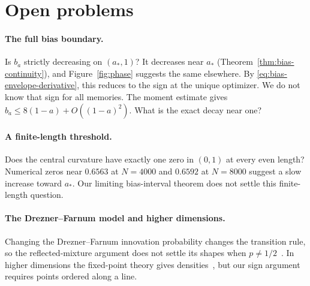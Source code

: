 \section{Open problems}\label{sec:open}

\paragraph{The full bias boundary.}
Is $b_a$ strictly decreasing on $(a_*,1)$? It decreases near $a_*$
(Theorem~\ref{thm:bias-continuity}), and Figure~\ref{fig:phase}
suggests the same elsewhere. By \eqref{eq:bias-envelope-derivative},
this reduces to the sign at the unique optimizer. We do not know
that sign for all memories. The moment estimate gives
$b_a\le8(1-a)+O((1-a)^2)$. What is the exact decay near one?

\paragraph{A finite-length threshold.}
Does the central curvature have exactly one zero in $(0,1)$ at
every even length? Numerical zeros near $0.6563$ at $N=4000$ and
$0.6592$ at $N=8000$ suggest a slow increase toward $a_*$. Our limiting bias-interval theorem does not settle this
finite-length question.

\paragraph{The Drezner--Farnum model and higher dimensions.}
Changing the Drezner--Farnum innovation probability changes the
transition rule, so the reflected-mixture argument does not settle
its shapes when $p\ne1/2$~\cite{dreznerfarnum1993}.
In higher dimensions the fixed-point theory gives densities~\cite{glr2026},
but our sign argument requires points ordered along a line.
